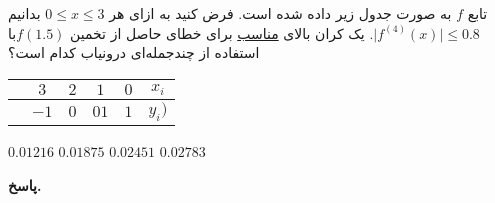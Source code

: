 تابع
\(f\)
به صورت جدول زیر داده شده است. فرض کنید به ازای هر 
\(0\leq x\leq 3\)
بدانیم
\(\mid f^{(4)}(x) \mid \leq 0.8\).
یک کران بالای \underline{مناسب} برای خطای حاصل از تخمین 
\(f(1.5)\)با استفاده از چندجمله‌ای درونیاب کدام است؟
\hspace*{3cm}
	\begin{tabular}{ccccc|c}
		& \(3\) &\(2\)&\(1\) & \(0\) & \(x_i\)\\
		\hline
		& \(-1\) & \(0\) & \(01\) &\( 1\) & \(y_i)\)
	\end{tabular}
\vspace*{-.3cm}
 \mulchoice
	{\(0.01216\)}
	{\(0.01875\)}
	{\(0.02451\)}
	{\(0.02783\)}

\begin{answer}

	\textbf{پاسخ.}
	
\end{answer}
